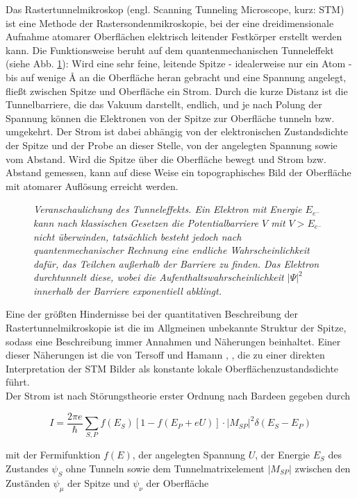 Das Rastertunnelmikroskop (engl. Scanning Tunneling Microscope, kurz: STM) ist eine Methode der
Rastersondenmikroskopie, bei der eine dreidimensionale Aufnahme atomarer Oberflächen elektrisch
leitender Festkörper erstellt werden kann. Die Funktionsweise beruht auf dem quantenmechanischen
Tunneleffekt (siehe Abb. \ref{tunnel}): Wird eine sehr feine, leitende Spitze - idealerweise nur ein
Atom - bis auf wenige {\AA} an die Oberfläche heran gebracht und eine Spannung angelegt, fließt zwischen Spitze und
Oberfläche ein Strom. Durch die kurze Distanz ist die Tunnelbarriere, die das Vakuum darstellt,
endlich, und je nach Polung der Spannung können die Elektronen von der Spitze zur Oberfläche tunneln bzw.
umgekehrt. Der Strom ist dabei abhängig von der elektronischen Zustandsdichte der Spitze und der
Probe an dieser Stelle, von der angelegten Spannung sowie vom Abstand. Wird die Spitze über die
Oberfläche bewegt und Strom bzw.
Abstand gemessen, kann auf diese Weise ein topographisches Bild der Oberfläche mit atomarer
Auflösung erreicht werden. 

\begin{figure}[H]
\centering
\sffamily 

\caption{\textit{Veranschaulichung des Tunneleffekts. Ein Elektron mit Energie $E_{e^-}$ kann nach
klassischen Gesetzen die Potentialbarriere $V$ mit $V>E_{e^-}$ nicht überwinden, tatsächlich besteht
jedoch nach quantenmechanischer Rechnung eine endliche Wahrscheinlichkeit dafür, das Teilchen
außerhalb der Barriere zu finden. Das Elektron durchtunnelt diese, wobei die
Aufenthaltswahrscheinlichkeit $|\Psi|^2$ innerhalb der Barriere exponentiell abklingt. }}
\label{tunnel}
\end{figure}


Eine der größten Hindernisse bei der quantitativen Beschreibung der Rastertunnelmikroskopie ist die
im Allgmeinen unbekannte Struktur der Spitze, sodass eine Beschreibung immer Annahmen und Näherungen
beinhaltet. Einer dieser Näherungen ist die von Tersoff und Hamann \cite{Ter83}, \cite{Ter85}, die
zu einer direkten Interpretation der STM Bilder als konstante lokale Oberflächenzustandsdichte führt.\\
Der Strom ist nach Störungstheorie erster Ordnung nach Bardeen \cite{Bar} gegeben durch

\[I=\frac{2\pi e}{\hbar}\sum_{S,P}
f(E_{S})[1-f(E_{P}+eU)]\cdot|M_{SP}|^2\delta(E_{S}-E_{P})\]

mit der Fermifunktion $f(E)$, der angelegten Spannung $U$, der Energie
$E_{S}$ des Zustandes $\psi_{S}$ ohne Tunneln sowie dem Tunnelmatrixelement $|M_{SP}|$
zwischen den Zuständen $\psi_{\mu}$ der Spitze und $\psi_{\nu}$ der Oberfläche

